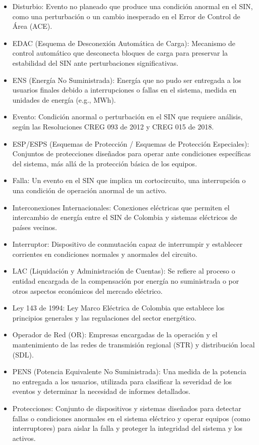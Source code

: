 \documentclass[a5paper]{book}%
\begin{document}
{\begin{itemize}
		\item Disturbio: Evento no planeado que produce una condición anormal en el SIN, como una perturbación o un cambio inesperado en el Error de Control de Área (ACE).
		\item EDAC (Esquema de Desconexión Automática de Carga): Mecanismo de control automático que desconecta bloques de carga para preservar la estabilidad del SIN ante perturbaciones significativas.
		\item ENS (Energía No Suministrada): Energía que no pudo ser entregada a los usuarios finales debido a interrupciones o fallas en el sistema, medida en unidades de energía (e.g., MWh).
		\item Evento: Condición anormal o perturbación en el SIN que requiere análisis, según las Resoluciones CREG 093 de 2012 y CREG 015 de 2018.
		\item ESP/ESPS (Esquemas de Protección / Esquemas de Protección Especiales): Conjuntos de protecciones diseñados para operar ante condiciones específicas del sistema, más allá de la protección básica de los equipos.
		\item Falla: Un evento en el SIN que implica un cortocircuito, una interrupción o una condición de operación anormal de un activo.
		\item Interconexiones Internacionales: Conexiones eléctricas que permiten el intercambio de energía entre el SIN de Colombia y sistemas eléctricos de países vecinos.
		\item Interruptor: Dispositivo de conmutación capaz de interrumpir y establecer corrientes en condiciones normales y anormales del circuito.
		\item LAC (Liquidación y Administración de Cuentas): Se refiere al proceso o entidad encargada de la compensación por energía no suministrada o por otros aspectos económicos del mercado eléctrico.
		\item Ley 143 de 1994: Ley Marco Eléctrica de Colombia que establece los principios generales y las regulaciones del sector energético.
		\item Operador de Red (OR): Empresas encargadas de la operación y el mantenimiento de las redes de transmisión regional (STR) y distribución local (SDL).
		\item PENS (Potencia Equivalente No Suministrada): Una medida de la potencia no entregada a los usuarios, utilizada para clasificar la severidad de los eventos y determinar la necesidad de informes detallados.
		\item Protecciones: Conjunto de dispositivos y sistemas diseñados para detectar fallas o condiciones anormales en el sistema eléctrico y operar equipos (como interruptores) para aislar la falla y proteger la integridad del sistema y los activos.

\end{itemize}}
\end{document}
